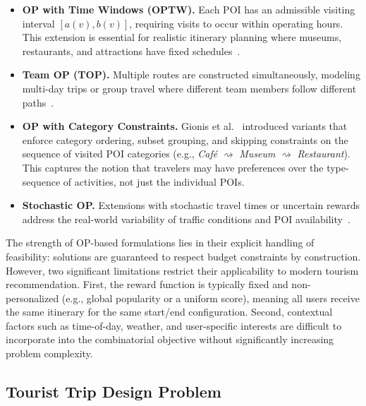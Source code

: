 \begin{itemize}
  \item \textbf{OP with Time Windows (OPTW).} Each POI has an admissible visiting interval $[a(v), b(v)]$, requiring visits to occur within operating hours. This extension is essential for realistic itinerary planning where museums, restaurants, and attractions have fixed schedules~\cite{vansteenwegen2011op}.
  
  \item \textbf{Team OP (TOP).} Multiple routes are constructed simultaneously, modeling multi-day trips or group travel where different team members follow different paths~\cite{chao1996team}.
  
  \item \textbf{OP with Category Constraints.} Gionis et al.~\cite{gionis2014customized} introduced variants that enforce category ordering, subset grouping, and skipping constraints on the sequence of visited POI categories (e.g., \textit{Café} $\rightsquigarrow$ \textit{Museum} $\rightsquigarrow$ \textit{Restaurant}). This captures the notion that travelers may have preferences over the type-sequence of activities, not just the individual POIs.
  
  \item \textbf{Stochastic OP.} Extensions with stochastic travel times or uncertain rewards address the real-world variability of traffic conditions and POI availability~\cite{ilhan2008stochastic}.
\end{itemize}

The strength of OP-based formulations lies in their explicit handling of feasibility: solutions are guaranteed to respect budget constraints by construction. However, two significant limitations restrict their applicability to modern tourism recommendation. First, the reward function is typically fixed and non-personalized (e.g., global popularity or a uniform score), meaning all users receive the same itinerary for the same start/end configuration. Second, contextual factors such as time-of-day, weather, and user-specific interests are difficult to incorporate into the combinatorial objective without significantly increasing problem complexity.

\subsection{Tourist Trip Design Problem}
\label{sec:sota-nonpers-ttdp}

